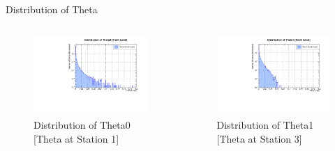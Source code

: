 \begin{frame}{Distribution of Theta}
	\begin{columns}
		\begin{column}{0.5\linewidth}
			\begin{figure}
				\includegraphics[width=\linewidth]{./output/Theta0.pdf}
				\caption{\tiny Distribution of Theta0 [Theta at Station 1]}
			\end{figure}
		\end{column}
		\begin{column}{0.5\linewidth}
			\begin{figure}
				\includegraphics[width=\linewidth]{./output/Theta1.pdf}
				\caption{\tiny Distribution of Theta1 [Theta at Station 3]}
			\end{figure}
		\end{column}

\end{columns}
\end{frame}
